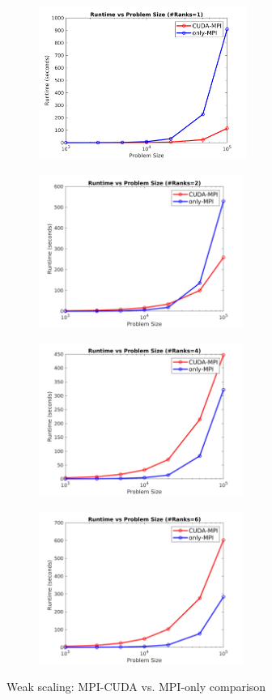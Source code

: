 \documentclass[sigplan,screen]{acmart}
\begin{document}
\begin{figure}
	\begin{subfigure}{0.3\textwidth}
		\includegraphics[trim= 10 5 35 10,clip, width=0.95\linewidth, height=5cm]{compare_weak_rank1.png} 
		\caption{}
	\end{subfigure}
	\begin{subfigure}{0.3\textwidth}
		\includegraphics[trim= 10 5 35 10,clip, width=0.95\linewidth, height=5cm]{compare_weak_rank2.png}
		\caption{}
	\end{subfigure}
	\begin{subfigure}{0.3\textwidth}
		\includegraphics[trim= 10 5 35 10,clip, width=0.95\linewidth, height=5cm]{compare_weak_rank4.png} 
		\caption{}
	\end{subfigure}
	\begin{subfigure}{0.3\textwidth}
		\includegraphics[trim= 10 5 35 10,clip, width=0.95\linewidth, height=5cm]{compare_weak_rank6.png}
		\caption{}
	\end{subfigure}
	\caption{Weak scaling: MPI-CUDA vs. MPI-only comparison}
	\label{compare_weak}
\end{figure}
\end{document}
